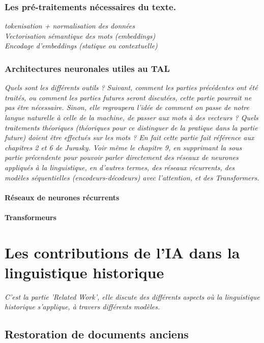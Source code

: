 \documentclass[12pt, french]{report}
\begin{document}
\subsection{Les pré-traitements nécessaires du texte.}
\textit{tokenisation + normalisation des données\\
    Vectorisation sémantique des mots (embeddings)\\
    Encodage d'embeddings (statique ou contextuelle)}

\subsection{Architectures neuronales utiles au TAL}
\textit{Quels sont les différents outils ?}
\textit{Suivant, comment les parties précédentes ont été traités, ou comment les parties futures seront discutées, cette partie pourrait ne pas être nécessaire. Sinon, elle regroupera l'idée de comment on passe de notre langue naturelle à celle de la machine, de passer aux mots à des vecteurs ? Quels traitements théoriques (théoriques pour ce distinguer de la pratique dans la partie future) doient être effectués sur les mots ? En fait cette partie fait référence aux chapitres 2 et 6 de Jurasky. Voir même le chapitre 9, en supprimant la sous partie précendente pour pouvoir parler directement des réseaux de neurones appliqués à la linguistique, en d'autres termes, des réseaux récurrents, des modèles séquentielles (encodeurs-décodeurs) avec l'attention, et des Transformers.}\\

\subsubsection{Réseaux de neurones récurrents}

\subsubsection{Transformeurs}


\chapter{Les contributions de l'IA dans la linguistique historique}
\textit{C'est la partie 'Related Work', elle discute des différents aspects où la linguistique historique s'applique, à travers différents modèles.}
\section{Restoration de documents anciens}
\end{document}
